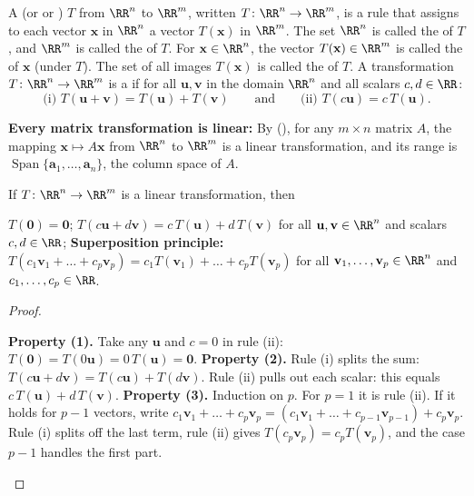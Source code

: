 \documentclass[10pt]{scrartcl}
\newcommand{\vv}[1]{\mathbf{#1}}
\DeclareMathOperator{\spn}{Span}\DeclareMathOperator{\Col}{Col}\DeclareMathOperator{\range}{range}
\begin{document}
\begin{definition*}
  \begin{itemize}
    \ii A  (or  or ) $T$ from $\RR^n$ to $\RR^m$, written $T\colon\RR^n\to\RR^m$, is a rule that assigns to each vector $\vv x$ in $\RR^n$ a vector $T(\vv x)$ in $\RR^m$.
    \ii The set $\RR^n$ is called the  of $T$, and $\RR^m$ is called the  of $T$. For $\vv x\in\RR^n$, the vector $T(\vv x)\in\RR^m$ is called the  of $\vv x$ (under $T$). The set of all images $T(\vv x)$ is called the  of $T$.
    \ii A transformation $T\colon\RR^n\to\RR^m$ is a  if for all $\vv u,\vv v$ in the domain $\RR^n$ and all scalars $c,d\in\RR$:
    \[
      \text{(i) } T(\vv u + \vv v) = T(\vv u) + T(\vv v) \qquad\text{and}\qquad \text{(ii) } T(c\vv u) = c\,T(\vv u).
    \]
  \end{itemize}
\end{definition*}

\begin{itemize}
  \ii \textbf{Every matrix transformation is linear:} By (), for any $m\times n$ matrix $A$, the mapping $\vv x\mapsto A\vv x$ from $\RR^n$ to $\RR^m$ is a linear transformation, and its range is $\spn\{\vv a_1,\dots,\vv a_n\}$, the column space of $A$.
\end{itemize}

\begin{proposition*}
  If $T\colon\RR^n\to\RR^m$ is a linear transformation, then
  \begin{enumerate}[(1)]
    \ii $T(\vv 0)=\vv 0$;
    \ii $T(c\vv u+d\vv v)=c\,T(\vv u)+d\,T(\vv v)$ for all $\vv u,\vv v\in\RR^n$ and scalars $c,d\in\RR$;
    \ii \textbf{Superposition principle:} $T(c_1\vv v_1+\dots+c_p\vv v_p)=c_1T(\vv v_1)+\dots+c_pT(\vv v_p)$ for all $\vv v_1,\dots,\vv v_p\in\RR^n$ and $c_1,\dots,c_p\in\RR$.
  \end{enumerate}
\end{proposition*}
\begin{proof}
  \begin{steps}
    \ii \textbf{Property (1).} Take any $\vv u$ and $c=0$ in rule (ii): $T(\vv 0)=T(0\vv u)=0\,T(\vv u)=\vv 0$.
    \ii \textbf{Property (2).} Rule (i) splits the sum: $T(c\vv u+d\vv v)=T(c\vv u)+T(d\vv v)$. Rule (ii) pulls out each scalar: this equals $c\,T(\vv u)+d\,T(\vv v)$.
    \ii \textbf{Property (3).} Induction on $p$. For $p=1$ it is rule (ii). If it holds for $p-1$ vectors, write $c_1\vv v_1+\dots+c_p\vv v_p=(c_1\vv v_1+\dots+c_{p-1}\vv v_{p-1})+c_p\vv v_p$. Rule (i) splits off the last term, rule (ii) gives $T(c_p\vv v_p)=c_pT(\vv v_p)$, and the case $p-1$ handles the first part.
  \end{steps}
\end{proof}
\end{document}
